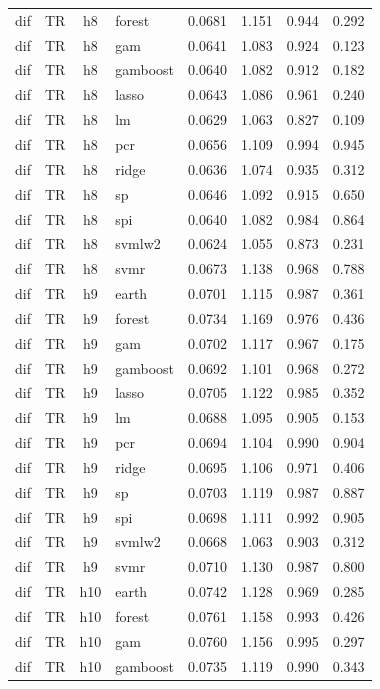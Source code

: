 \begin{ThreePartTable}
\begin{longtable}[t]{llclcccc}
dif & TR & h8 & forest & 0.0681 & 1.151 & 0.944 & 0.292\\
dif & TR & h8 & gam & 0.0641 & 1.083 & 0.924 & 0.123\\
dif & TR & h8 & gamboost & 0.0640 & 1.082 & 0.912 & 0.182\\
dif & TR & h8 & lasso & 0.0643 & 1.086 & 0.961 & 0.240\\
dif & TR & h8 & lm & 0.0629 & 1.063 & 0.827 & 0.109\\
dif & TR & h8 & pcr & 0.0656 & 1.109 & 0.994 & 0.945\\
dif & TR & h8 & ridge & 0.0636 & 1.074 & 0.935 & 0.312\\
dif & TR & h8 & sp & 0.0646 & 1.092 & 0.915 & 0.650\\
dif & TR & h8 & spi & 0.0640 & 1.082 & 0.984 & 0.864\\
dif & TR & h8 & svmlw2 & 0.0624 & 1.055 & 0.873 & 0.231\\
dif & TR & h8 & svmr & 0.0673 & 1.138 & 0.968 & 0.788\\
\addlinespace
dif & TR & h9 & earth & 0.0701 & 1.115 & 0.987 & 0.361\\
dif & TR & h9 & forest & 0.0734 & 1.169 & 0.976 & 0.436\\
dif & TR & h9 & gam & 0.0702 & 1.117 & 0.967 & 0.175\\
dif & TR & h9 & gamboost & 0.0692 & 1.101 & 0.968 & 0.272\\
dif & TR & h9 & lasso & 0.0705 & 1.122 & 0.985 & 0.352\\
dif & TR & h9 & lm & 0.0688 & 1.095 & 0.905 & 0.153\\
dif & TR & h9 & pcr & 0.0694 & 1.104 & 0.990 & 0.904\\
dif & TR & h9 & ridge & 0.0695 & 1.106 & 0.971 & 0.406\\
dif & TR & h9 & sp & 0.0703 & 1.119 & 0.987 & 0.887\\
dif & TR & h9 & spi & 0.0698 & 1.111 & 0.992 & 0.905\\
dif & TR & h9 & svmlw2 & 0.0668 & 1.063 & 0.903 & 0.312\\
dif & TR & h9 & svmr & 0.0710 & 1.130 & 0.987 & 0.800\\
\addlinespace
dif & TR & h10 & earth & 0.0742 & 1.128 & 0.969 & 0.285\\
dif & TR & h10 & forest & 0.0761 & 1.158 & 0.993 & 0.426\\
dif & TR & h10 & gam & 0.0760 & 1.156 & 0.995 & 0.297\\
dif & TR & h10 & gamboost & 0.0735 & 1.119 & 0.990 & 0.343\\

\end{longtable}
\end{ThreePartTable}
